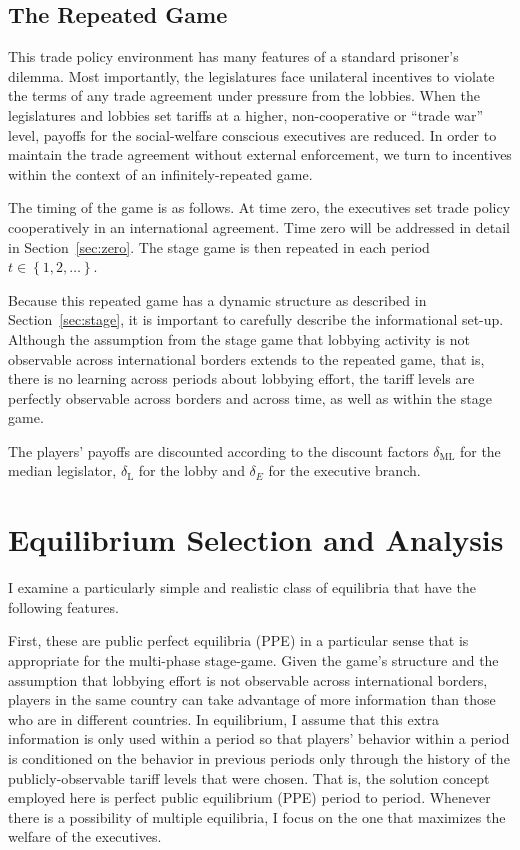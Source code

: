 \documentclass[authoryear, review]{elsarticle}
\newcommand{\de}{\delta}
\begin{document}
\subsection{The Repeated Game}
\label{sec:repeated}
This trade policy environment has many features of a standard prisoner's dilemma. Most importantly, the legislatures face unilateral incentives to violate the terms of any trade agreement under pressure from the lobbies. When the legislatures and lobbies set tariffs at a higher, non-cooperative or ``trade war'' level, payoffs for the social-welfare conscious executives are reduced. In order to maintain the trade agreement without external enforcement, we turn to incentives within the context of an infinitely-repeated game.

The timing of the game is as follows. At time zero, the executives set trade policy cooperatively in an international agreement. Time zero will be addressed in detail in Section~\ref{sec:zero}. The stage game is then repeated in each period $t\in\left\{1,2,\ldots \right\}$.

Because this repeated game has a dynamic structure as described in Section~\ref{sec:stage}, it is important to carefully describe the informational set-up. Although the assumption from the stage game that lobbying activity is not observable across international borders extends to the repeated game, that is, there is no learning across periods about lobbying effort, the tariff levels are perfectly observable across borders and across time, as well as within the stage game.

The players' payoffs are discounted according to the discount factors $\de_\text{ML}$ for the median legislator, $\de_\text{L}$ for the lobby and $\de_E$ for the executive branch.


\section{Equilibrium Selection and Analysis}
\label{sec:eqm}
I examine a particularly simple and realistic class of equilibria that have the following features.

First, these are public perfect equilibria (PPE) in a particular sense that is appropriate for the multi-phase stage-game. Given the game's structure and the assumption that lobbying effort is not observable across international borders, players in the same country can take advantage of more information than those who are in different countries. In equilibrium, I assume that this extra information is only used within a period so that players' behavior within a period is conditioned on the behavior in previous periods only through the history of the publicly-observable tariff levels that were chosen. That is, the solution concept employed here is perfect public equilibrium (PPE) period to period. Whenever there is a possibility of multiple equilibria, I focus on the one that maximizes the welfare of the executives. 
\end{document}
